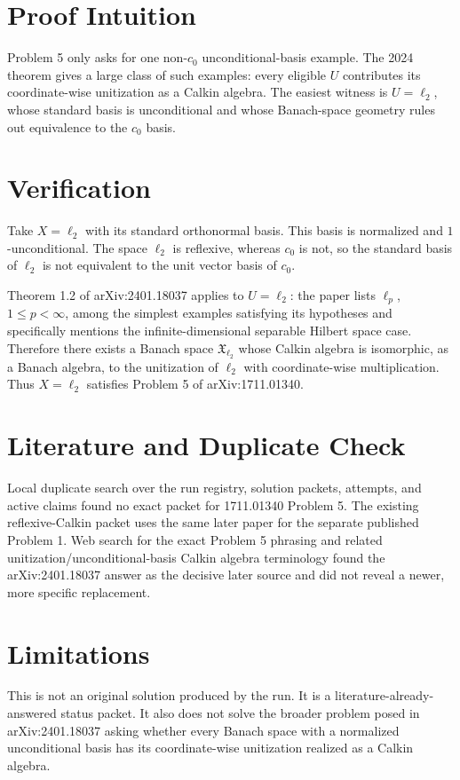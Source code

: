 \documentclass[11pt]{article}
\begin{document}
\section*{Proof Intuition}

Problem 5 only asks for one non-\(c_0\) unconditional-basis example. The 2024
theorem gives a large class of such examples: every eligible \(U\) contributes
its coordinate-wise unitization as a Calkin algebra. The easiest witness is
\(U=\ell_2\), whose standard basis is unconditional and whose Banach-space
geometry rules out equivalence to the \(c_0\) basis.

\section*{Verification}

Take \(X=\ell_2\) with its standard orthonormal basis. This basis is normalized
and \(1\)-unconditional. The space \(\ell_2\) is reflexive, whereas \(c_0\) is
not, so the standard basis of \(\ell_2\) is not equivalent to the unit vector
basis of \(c_0\).

Theorem 1.2 of arXiv:2401.18037 applies to \(U=\ell_2\): the paper lists
\(\ell_p\), \(1\leq p<\infty\), among the simplest examples satisfying its
hypotheses and specifically mentions the infinite-dimensional separable Hilbert
space case. Therefore there exists a Banach space \(\mathfrak X_{\ell_2}\)
whose Calkin algebra is isomorphic, as a Banach algebra, to the unitization of
\(\ell_2\) with coordinate-wise multiplication. Thus \(X=\ell_2\) satisfies
Problem 5 of arXiv:1711.01340.

\section*{Literature and Duplicate Check}

Local duplicate search over the run registry, solution packets, attempts, and
active claims found no exact packet for 1711.01340 Problem 5. The existing
reflexive-Calkin packet uses the same later paper for the separate published
Problem 1. Web search for the exact Problem 5 phrasing and related
unitization/unconditional-basis Calkin algebra terminology found the
arXiv:2401.18037 answer as the decisive later source and did not reveal a
newer, more specific replacement.

\section*{Limitations}

This is not an original solution produced by the run. It is a
literature-already-answered status packet. It also does not solve the broader
problem posed in arXiv:2401.18037 asking whether every Banach space with a
normalized unconditional basis has its coordinate-wise unitization realized as
a Calkin algebra.
\end{document}
